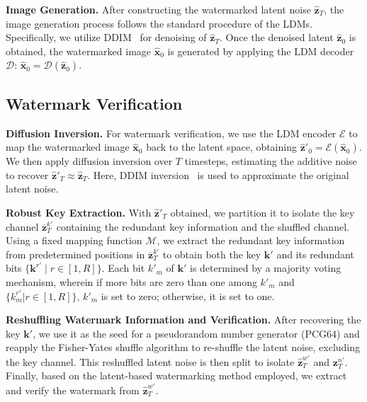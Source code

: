 \noindent
\textbf{Image Generation.}
After constructing the watermarked latent noise \(\hat{\mathbf{z}}_T\), the image generation process follows the standard procedure of the LDMs. Specifically, we utilize DDIM~\cite{song2020denoising} for denoising of \(\hat{\mathbf{z}}_T\). Once the denoised latent \(\hat{\mathbf{z}}_0\) is obtained, the watermarked image \(\hat{\mathbf{x}}_0\) is generated by applying the LDM decoder \(\mathcal{D}\): \(\hat{\mathbf{x}}_0 = \mathcal{D}(\hat{\mathbf{z}}_0)\).

\subsection{Watermark Verification}
\noindent
\textbf{Diffusion Inversion.}
For watermark verification, we use the LDM encoder \(\mathcal{E}\) to map the watermarked image \(\hat{\mathbf{x}}_0\) back to the latent space, obtaining \(\hat{\mathbf{z}}'_0 = \mathcal{E}(\hat{\mathbf{x}}_0)\). We then apply diffusion inversion over \(T\) timesteps, estimating the additive noise to recover 
\(\hat{\mathbf{z}}'_T \approx \hat{\mathbf{z}}_T\). Here, DDIM inversion~\cite{dimm_inversion} is used to approximate the original latent noise.

\noindent
\textbf{Robust Key Extraction.}  
With \(\hat{\mathbf{z}}'_T\) obtained, we partition it to isolate the key channel \(\overline{\mathbf{z}}_T^{k'}\) containing the redundant key information and the shuffled channel. Using a fixed mapping function \(\mathcal{M}\), we extract the redundant key information from predetermined positions in  \(\overline{\mathbf{z}}_T^{k'}\) to obtain both the key \(\mathbf{k}'\) and its redundant bits \(\{\mathbf{k}^{r'} \mid r \in [1, R]\}\). 
Each bit \(k'_m\) of \(\mathbf{k}'\) is determined by a majority voting mechanism, wherein if more bits are zero than one among \(k'_m\) and \(\{ k^{r'}_m | r \in [1, R] \}\), \(k'_m\) is set to zero; otherwise, it is set to one.

\noindent
\textbf{Reshuffling Watermark Information and Verification.}  
After recovering the key \(\mathbf{k}'\), we use it as the seed for a pseudorandom number generator (PCG64) and reapply the Fisher-Yates shuffle algorithm to re-shuffle the latent noise, excluding the key channel. 
This reshuffled latent noise is then split to isolate \(\hat{\mathbf{z}}_T^{w'}\) and \(\mathbf{z}_T^{n'}\). 
Finally, based on the latent-based watermarking method employed, we extract and verify the watermark from \(\hat{\mathbf{z}}_T^{w'}\).